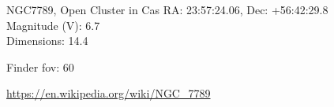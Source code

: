 \begin{block}{NGC7789, Open Cluster in Cas}
    RA: 23:57:24.06, Dec: +56:42:29.8 \\ 
    Magnitude (V): 6.7 \\ 
    Dimensions: 14.4 

    Finder fov: 60 

    \url{https://en.wikipedia.org/wiki/NGC_7789} 
\end{block}